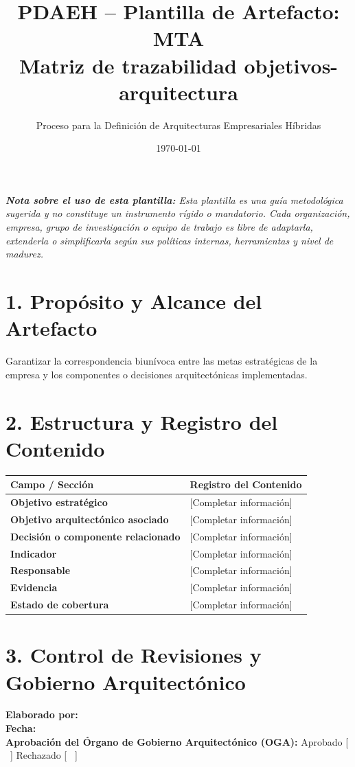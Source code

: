 \documentclass[11pt,a4paper]{article}
\title{\textbf{\color{brandgreen} PDAEH -- Plantilla de Artefacto: MTA} \\[0.3em] \large Matriz de trazabilidad objetivos-arquitectura}
\author{Proceso para la Definición de Arquitecturas Empresariales Híbridas}
\date{\today}
\begin{document}
\maketitle

\noindent \textit{\textbf{Nota sobre el uso de esta plantilla:} Esta plantilla es una guía metodológica sugerida y no constituye un instrumento rígido o mandatorio. Cada organización, empresa, grupo de investigación o equipo de trabajo es libre de adaptarla, extenderla o simplificarla según sus políticas internas, herramientas y nivel de madurez.}

\section*{1. Propósito y Alcance del Artefacto}
Garantizar la correspondencia biunívoca entre las metas estratégicas de la empresa y los componentes o decisiones arquitectónicas implementadas.

\section*{2. Estructura y Registro del Contenido}
\begin{tabularx}{\textwidth}{|>{\bfseries}p{4.5cm}|X|}
    \hline
    \rowcolor[gray]{0.92} Campo / Sección & Registro del Contenido \\ \hline
    \textbf{Objetivo estratégico} & [Completar información] \\ \hline
    \textbf{Objetivo arquitectónico asociado} & [Completar información] \\ \hline
    \textbf{Decisión o componente relacionado} & [Completar información] \\ \hline
    \textbf{Indicador} & [Completar información] \\ \hline
    \textbf{Responsable} & [Completar información] \\ \hline
    \textbf{Evidencia} & [Completar información] \\ \hline
    \textbf{Estado de cobertura} & [Completar información] \\ \hline
\end{tabularx}

\vspace{1.2cm}
\section*{3. Control de Revisiones y Gobierno Arquitectónico}
\noindent \textbf{Elaborado por:} \hrulefill \\[0.5em]
\textbf{Fecha:} \hrulefill \\[0.5em]
\textbf{Aprobación del Órgano de Gobierno Arquitectónico (OGA):} Aprobado [ \, ] \quad Rechazado [ \, ]
\end{document}
